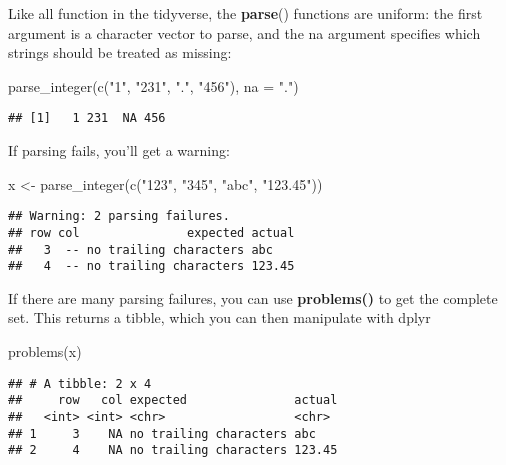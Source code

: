 \documentclass[
]{article}
\newenvironment{Shaded}{\begin{snugshade}}{\end{snugshade}}
\newcommand{\AttributeTok}[1]{\textcolor[rgb]{0.77,0.63,0.00}{#1}}
\newcommand{\FunctionTok}[1]{\textcolor[rgb]{0.00,0.00,0.00}{#1}}
\newcommand{\NormalTok}[1]{#1}
\newcommand{\OtherTok}[1]{\textcolor[rgb]{0.56,0.35,0.01}{#1}}
\newcommand{\StringTok}[1]{\textcolor[rgb]{0.31,0.60,0.02}{#1}}
\begin{document}
Like all function in the tidyverse, the \textbf{parse}() functions are
uniform: the first argument is a character vector to parse, and the na
argument specifies which strings should be treated as missing:

\begin{Shaded}
\begin{Highlighting}[]
\FunctionTok{parse\_integer}\NormalTok{(}\FunctionTok{c}\NormalTok{(}\StringTok{"1"}\NormalTok{, }\StringTok{"231"}\NormalTok{, }\StringTok{"."}\NormalTok{, }\StringTok{"456"}\NormalTok{), }\AttributeTok{na =} \StringTok{"."}\NormalTok{)}
\end{Highlighting}
\end{Shaded}

\begin{verbatim}
## [1]   1 231  NA 456
\end{verbatim}

If parsing fails, you'll get a warning:

\begin{Shaded}
\begin{Highlighting}[]
\NormalTok{x }\OtherTok{\textless{}{-}} \FunctionTok{parse\_integer}\NormalTok{(}\FunctionTok{c}\NormalTok{(}\StringTok{"123"}\NormalTok{, }\StringTok{"345"}\NormalTok{, }\StringTok{"abc"}\NormalTok{, }\StringTok{"123.45"}\NormalTok{))}
\end{Highlighting}
\end{Shaded}

\begin{verbatim}
## Warning: 2 parsing failures.
## row col               expected actual
##   3  -- no trailing characters abc   
##   4  -- no trailing characters 123.45
\end{verbatim}

If there are many parsing failures, you can use \textbf{problems()} to
get the complete set. This returns a tibble, which you can then
manipulate with dplyr

\begin{Shaded}
\begin{Highlighting}[]
\FunctionTok{problems}\NormalTok{(x)}
\end{Highlighting}
\end{Shaded}

\begin{verbatim}
## # A tibble: 2 x 4
##     row   col expected               actual
##   <int> <int> <chr>                  <chr> 
## 1     3    NA no trailing characters abc   
## 2     4    NA no trailing characters 123.45
\end{verbatim}
\end{document}
